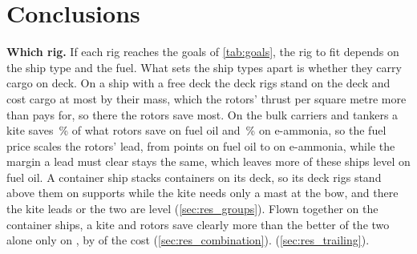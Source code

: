 \section{Conclusions}
\label{sec:conclusions}

\textbf{Which rig.} If each rig reaches the goals of \cref{tab:goals}, the rig to fit depends on the ship type and the fuel. \NumAdvice{} What sets the ship types apart is whether they carry cargo on deck. On a ship with a free deck the deck rigs stand on the deck and cost cargo at most by their mass, which the rotors' thrust per square metre more than pays for, so there the rotors save most. On the bulk carriers and tankers a kite saves \NumKiteShareBulkTankerOil\,\% of what rotors save on fuel oil and \NumKiteShareBulkTankerAmmonia\,\% on e-ammonia, so the fuel price scales the rotors' lead, from \NumRotorLeadBulkTankerOil{} points on fuel oil to \NumRotorLeadBulkTankerAmmonia{} on e-ammonia, while the margin a lead must clear stays the same, which leaves more of these ships level on fuel oil. A container ship stacks containers on its deck, so its deck rigs stand above them on supports while the kite needs only a mast at the bow, and there the kite leads or the two are level (\cref{sec:res_groups}).  Flown together on the container ships, a kite and rotors save clearly more than the better of the two alone only on \NumCombinationLeading{}, by \NumCombinationBestGain{} of the cost (\cref{sec:res_combination}). \NumTrailingSummary{} (\cref{sec:res_trailing}).

